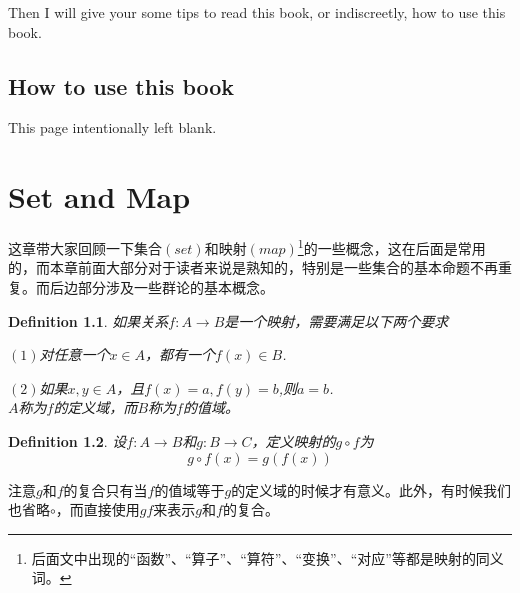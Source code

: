 \documentclass[11pt,a4paper,openany]{book}%
\theoremstyle{plain}%
\newtheorem{defi}{Definition}[chapter]%
\newcommand{\NO}[1]{{$(#1)$}}%
\begin{document}
Then I will give your some tips to read this book, or indiscreetly, how to use this book.

\section*{How to use this book}
\tableofcontents
\clearpage
\thispagestyle{empty}
\begin{center}
This page intentionally left blank.
\end{center}
\mainmatter
\chapter{Set and Map}
这章带大家回顾一下集合$(set)$和映射$(map)$\footnote{后面文中出现的“函数”、“算子”、“算符”、“变换”、“对应”等都是映射的同义词。}的一些概念，这在后面是常用的，而本章前面大部分对于读者来说是熟知的，特别是一些集合的基本命题不再重复。而后边部分涉及一些群论的基本概念。

\begin{defi}
\label{1.1}
如果关系$f:A\rightarrow B$是一个映射，需要满足以下两个要求

\NO{1}对任意一个$x\in A$，都有一个$f(x)\in B$.

\NO{2}如果$x,y\in A$，且$f(x)=a,f(y)=b$,则$a=b$.\\
$A$称为$f$的定义域，而$B$称为$f$的值域。
\end{defi}
\begin{defi}
设$f:A\rightarrow B$和$g:B\rightarrow C$，定义映射的$g\circ f$为
\[
g\circ f(x)=g(f(x))
\]
\end{defi}
注意$g$和$f$的复合只有当$f$的值域等于$g$的定义域的时候才有意义。此外，有时候我们也省略$\circ$，而直接使用$gf$来表示$g$和$f$的复合。
\end{document}
